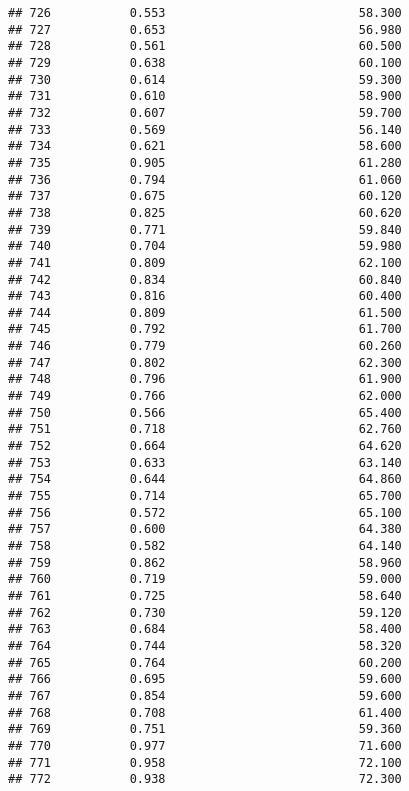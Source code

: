\documentclass[
]{article}
\begin{document}
\begin{verbatim}
## 726           0.553                           58.300
## 727           0.653                           56.980
## 728           0.561                           60.500
## 729           0.638                           60.100
## 730           0.614                           59.300
## 731           0.610                           58.900
## 732           0.607                           59.700
## 733           0.569                           56.140
## 734           0.621                           58.600
## 735           0.905                           61.280
## 736           0.794                           61.060
## 737           0.675                           60.120
## 738           0.825                           60.620
## 739           0.771                           59.840
## 740           0.704                           59.980
## 741           0.809                           62.100
## 742           0.834                           60.840
## 743           0.816                           60.400
## 744           0.809                           61.500
## 745           0.792                           61.700
## 746           0.779                           60.260
## 747           0.802                           62.300
## 748           0.796                           61.900
## 749           0.766                           62.000
## 750           0.566                           65.400
## 751           0.718                           62.760
## 752           0.664                           64.620
## 753           0.633                           63.140
## 754           0.644                           64.860
## 755           0.714                           65.700
## 756           0.572                           65.100
## 757           0.600                           64.380
## 758           0.582                           64.140
## 759           0.862                           58.960
## 760           0.719                           59.000
## 761           0.725                           58.640
## 762           0.730                           59.120
## 763           0.684                           58.400
## 764           0.744                           58.320
## 765           0.764                           60.200
## 766           0.695                           59.600
## 767           0.854                           59.600
## 768           0.708                           61.400
## 769           0.751                           59.360
## 770           0.977                           71.600
## 771           0.958                           72.100
## 772           0.938                           72.300

\end{verbatim}
\end{document}
